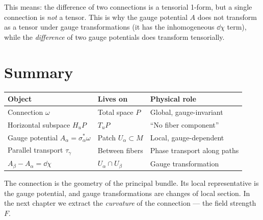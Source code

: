 This means: the difference of two connections is a tensorial 1-form, but a single connection is \emph{not} a tensor. This is why the gauge potential $A$ does not transform as a tensor under gauge transformations (it has the inhomogeneous $\dd\chi$ term), while the \emph{difference} of two gauge potentials does transform tensorially.

\section{Summary}

\begin{table}[h]
\centering
\renewcommand{\arraystretch}{1.4}
\begin{tabular}{lll}
\toprule
\textbf{Object} & \textbf{Lives on} & \textbf{Physical role} \\
\midrule
Connection $\omega$ & Total space $P$ & Global, gauge-invariant \\
Horizontal subspace $H_uP$ & $T_uP$ & ``No fiber component'' \\
Gauge potential $A_\alpha = \sigma_\alpha^*\omega$ & Patch $U_\alpha \subset M$ & Local, gauge-dependent \\
Parallel transport $\tau_\gamma$ & Between fibers & Phase transport along paths \\
$A_\beta - A_\alpha = \dd\chi$ & $U_\alpha \cap U_\beta$ & Gauge transformation \\
\bottomrule
\end{tabular}
\end{table}

The connection is the geometry of the principal bundle. Its local representative is the gauge potential, and gauge transformations are changes of local section. In the next chapter we extract the \emph{curvature} of the connection --- the field strength $F$.
